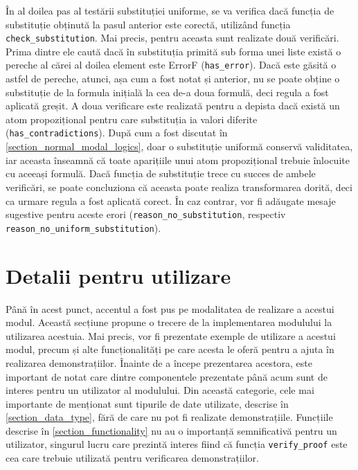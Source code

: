 \documentclass[12pt, openany]{book}
\newcommand{\mysectionreference}[1]{\autoref{#1}}
\begin{document}
            \par{}
                În al doilea pas al testării substituției uniforme, se va verifica dacă funcția de substituție obținută 
                la pasul anterior este corectă, utilizând funcția \texttt{check\_substitution}. Mai precis, pentru 
                aceasta sunt realizate două verificări. Prima dintre ele caută dacă în substituția primită sub forma 
                unei liste există o pereche al cărei al doilea element este ErrorF (\texttt{has\_error}). Dacă este 
                găsită o astfel de pereche, atunci, așa cum a fost notat și anterior, nu se poate obține o substituție 
                de la formula inițială la cea de-a doua formulă, deci regula a fost aplicată greșit. A doua verificare 
                este realizată pentru a depista dacă există un atom propozițional pentru care substituția ia valori 
                diferite (\texttt{has\_contradictions}). După cum a fost discutat în 
                \mysectionreference{section_normal_modal_logics}, doar o substituție uniformă conservă validitatea, iar 
                aceasta înseamnă că toate aparițiile unui atom propozițional trebuie înlocuite cu aceeași formulă. Dacă 
                funcția de substituție trece cu succes de ambele verificări, se poate concluziona că aceasta poate 
                realiza transformarea dorită, deci ca urmare regula a fost aplicată corect. În caz contrar, vor fi 
                adăugate mesaje sugestive pentru aceste erori (\texttt{reason\_no\_substitution}, respectiv 
                \texttt{reason\_no\_uniform\_substitution}).

        \section{Detalii pentru utilizare} %
        \label{section_usage}
            \par{}
                Până în acest punct, accentul a fost pus pe modalitatea de realizare a acestui modul. Această secțiune 
                propune o trecere de la implementarea modulului la utilizarea acestuia. Mai precis, vor fi prezentate 
                exemple de utilizare a acestui modul, precum și alte funcționalități pe care acesta le oferă 
                pentru a ajuta în realizarea demonstrațiilor. Înainte de a începe prezentarea acestora, este important 
                de notat care dintre componentele prezentate până acum sunt de interes pentru un utilizator al 
                modulului. Din această categorie, cele mai importante de menționat sunt tipurile de date utilizate, 
                descrise în \mysectionreference{section_data_type}, fără de care nu pot fi realizate demonstrațiile. 
                Funcțiile descrise în \mysectionreference{section_functionality} nu au o importanță semnificativă pentru 
                un utilizator, singurul lucru care prezintă interes fiind că funcția \texttt{verify\_proof} este cea 
                care trebuie utilizată pentru verificarea demonstrațiilor.
            
\end{document}
